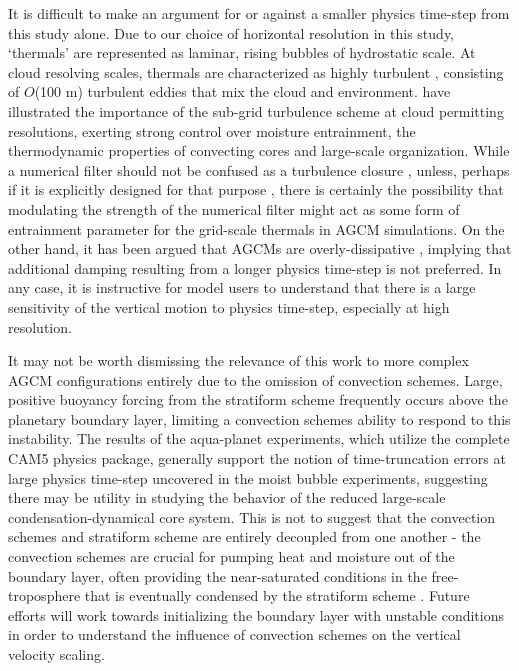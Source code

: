 It is difficult to make an argument for or against a smaller physics time-step from this study alone. Due to our choice of horizontal resolution in this study, ‘thermals’ are represented as laminar, rising bubbles of hydrostatic scale. At cloud resolving scales, thermals are characterized as highly turbulent \citep{GETAL1991JAS,WS1998MWR,BETAL2002MWR}, consisting of $O$(100 m) turbulent eddies that mix the cloud and environment. \cite{TETAL2017JAMES} have illustrated the importance of the sub-grid turbulence scheme at cloud permitting resolutions, exerting strong control over moisture entrainment, the thermodynamic properties of convecting cores and large-scale organization. While a numerical filter should not be confused as a turbulence closure \citep{JW2010LNCSE}, unless, perhaps if it is explicitly designed for that purpose \citep[e.g.,][]{GMR2007,METAL2015JCP}, there is certainly the possibility that modulating the strength of the numerical filter might act as some form of entrainment parameter for the grid-scale thermals in AGCM simulations. On the other hand, it has been argued that AGCMs are overly-dissipative \citep{S2005QJR,BETAL2012JCLIM}, implying that additional damping resulting from a longer physics time-step is not preferred. In any case, it is instructive for model users to understand that there is a large sensitivity of the vertical motion to physics time-step, especially at high resolution.

It may not be worth dismissing the relevance of this work to more complex AGCM configurations entirely due to the omission of convection schemes. Large, positive buoyancy forcing from the stratiform scheme frequently occurs above the planetary boundary layer, limiting a convection schemes ability to respond to this instability. The results of the aqua-planet experiments, which utilize the complete CAM5 physics package, generally support the notion of time-truncation errors at large physics time-step uncovered in the moist bubble experiments, suggesting there may be utility in studying the behavior of the reduced large-scale condensation-dynamical core system. This is not to suggest that the convection schemes and stratiform scheme are entirely decoupled from one another - the convection schemes are crucial for pumping heat and moisture out of the boundary layer, often providing the near-saturated conditions in the free-troposphere that is eventually condensed by the stratiform scheme \citep{PETAL2014JCLIM}. Future efforts will work towards initializing the boundary layer with unstable conditions in order to understand the influence of convection schemes on the vertical velocity scaling. 

